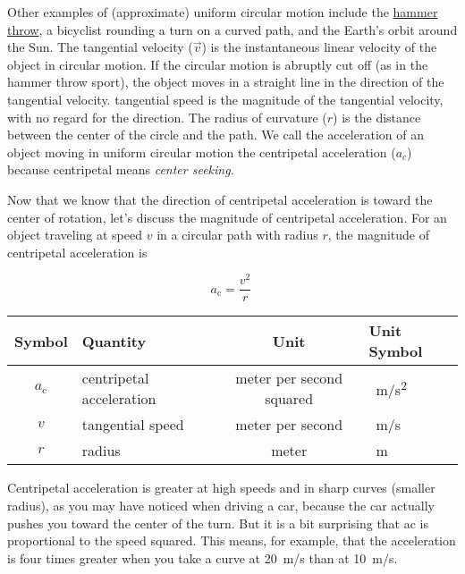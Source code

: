 \documentclass[main-physics.tex]{subfiles}
\begin{document}
Other examples of (approximate) uniform circular motion include the \href{https://youtu.be/3NYlYN-QTig}{hammer throw}, a bicyclist rounding a turn on a curved path, and the Earth's orbit around the Sun. The \gls{tangential velocity} ($\vec{v}$) is the instantaneous linear velocity of the object in circular motion. If the circular motion is abruptly cut off (as in the hammer throw sport), the object moves in a straight line in the direction of the tangential velocity. \Gls{tangential speed} is the magnitude of the tangential velocity, with no regard for the direction. The \gls{radius of curvature} ($r$) is the distance between the center of the circle and the path. We call the acceleration of an object moving in uniform circular motion the \gls{centripetal acceleration} ($a_c$) because centripetal means \textit{center seeking}.

\vspace{1em}

Now that we know that the direction of centripetal acceleration is toward the center of rotation, let's discuss the magnitude of centripetal acceleration. For an object traveling at speed $v$ in a circular path with radius $r$, the magnitude of centripetal acceleration is


\begin{equation} \label{5vsZ8y}
    a_{\text{c}} = \frac{v^2}{r}\ 
\end{equation}

\begin{center}
    \begin{tabular}{cl|cl}
    \hline
    \textbf{Symbol} & \textbf{Quantity} & \textbf{Unit} & \textbf{Unit Symbol}  \\
    \hline\hline
    \rule{0pt}{2.5ex}
        $a_{\text{c}}$ & centripetal acceleration & meter per second squared & \SI{}{m/s^2}\\
        $v$ & tangential speed & meter per second & \SI{}{m/s} \\
        $r$ & radius & meter & \SI{}{m}\\
    \hline
    \end{tabular}
\end{center}

Centripetal acceleration is greater at high speeds and in sharp curves (smaller radius), as you may have noticed when driving a car, because the car actually pushes you toward the center of the turn. But it is a bit surprising that ac is proportional to the speed squared. This means, for example, that the acceleration is four times greater when you take a curve at \SI{20}{m/s} than at \SI{10}{m/s}.
\end{document}
